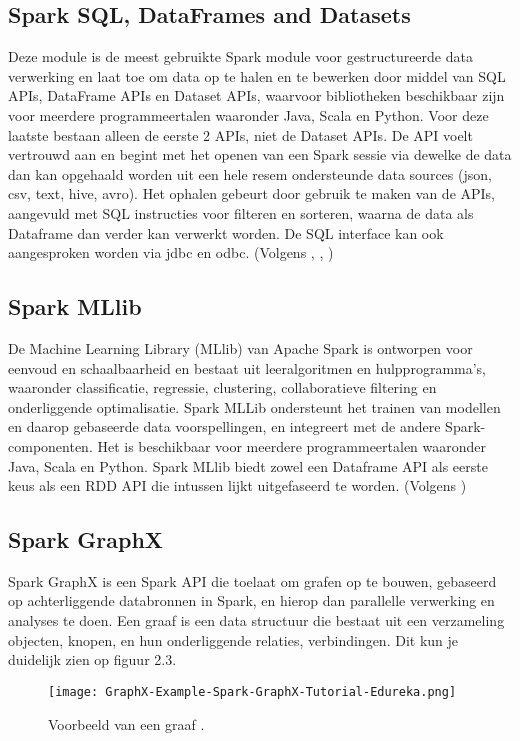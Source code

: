 \subsection{Spark SQL, DataFrames and Datasets}
Deze module is de meest gebruikte Spark module voor gestructureerde data verwerking en laat toe om data op te halen en te bewerken door middel van SQL APIs, DataFrame APIs en Dataset APIs, waarvoor bibliotheken beschikbaar zijn voor meerdere programmeertalen waaronder Java, Scala en Python. Voor deze laatste bestaan alleen de eerste 2 APIs, niet de Dataset APIs.
De API voelt vertrouwd aan en begint met het openen van een Spark sessie via dewelke de data dan kan opgehaald worden uit een hele resem ondersteunde data sources (json, csv, text, hive, avro). Het ophalen gebeurt door gebruik te maken van de APIs, aangevuld met SQL instructies voor filteren en sorteren, waarna de data als Dataframe dan verder kan verwerkt worden.
De SQL interface kan ook aangesproken worden via jdbc en odbc.
(Volgens \textcite{Spark2023}, \textcite{Naveen2023}, \textcite{Spark2023a})

\subsection{Spark MLlib}
De Machine Learning Library (MLlib) van Apache Spark is ontworpen voor eenvoud en schaalbaarheid  en bestaat uit leeralgoritmen en hulpprogramma's, waaronder classificatie, regressie, clustering, collaboratieve filtering en onderliggende optimalisatie. Spark MLLib ondersteunt het trainen van modellen en daarop gebaseerde data voorspellingen, en integreert met de andere Spark-componenten. Het is beschikbaar voor meerdere programmeertalen waaronder Java, Scala en Python.
Spark MLlib biedt zowel een Dataframe API als eerste keus als een RDD API die intussen lijkt uitgefaseerd te worden.
(Volgens \autocite{Spark2023b})

\subsection{Spark GraphX}
Spark GraphX is een Spark API die toelaat om grafen op te bouwen, gebaseerd op achterliggende databronnen in Spark, en hierop dan parallelle verwerking en analyses te doen. 
Een graaf is een data structuur die bestaat uit een verzameling objecten, knopen, en hun onderliggende relaties, verbindingen. Dit kun je duidelijk zien op figuur 2.3.
\newline
\newline
\begin{figure}[H]
    \texttt{[image: GraphX-Example-Spark-GraphX-Tutorial-Edureka.png]}
    \caption{Voorbeeld van een graaf \autocite{Dayananda2019}.}
\end{figure}


